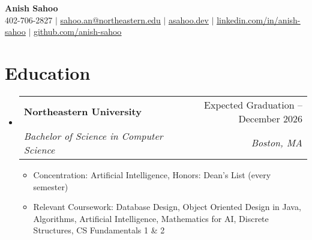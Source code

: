 \documentclass[letterpaper,11pt]{article}
\makeatletter
\newcommand{\resumeItem}[1]{
  \item\small{
    {#1 \vspace{-2pt}}
  }
}
\newcommand{\resumeSubheading}[4]{
  \vspace{-2pt}\item
    \begin{tabular*}{0.97\textwidth}[t]{l@{\extracolsep{\fill}}r}
      \textbf{#1} & #2 \\
      \textit{\small#3} & \textit{\small #4} \\
    \end{tabular*}\vspace{-7pt}
}
\newcommand{\resumeSubHeadingListStart}{\begin{itemize}[leftmargin=0.15in, label={}]}
\newcommand{\resumeSubHeadingListEnd}{\end{itemize}}
\newcommand{\resumeItemListStart}{\begin{itemize}}
\newcommand{\resumeItemListEnd}{\end{itemize}\vspace{-5pt}}
\makeatother
\begin{document}

\begin{center}
    \textbf{\Huge Anish Sahoo} \\ \vspace{1pt}
    \small 402-706-2827 
    $|$ 
    \href{mailto:sahoo.an@northeastern.edu}{\underline{sahoo.an@northeastern.edu}} $|$ 
    \href{https://asahoo.dev}{\underline{asahoo.dev}}
    $|$
    \href{https://linkedin.com/in/anish-sahoo}{\underline{linkedin.com/in/anish-sahoo}} $|$
    \href{https://github.com/anish-sahoo}{\underline{github.com/anish-sahoo}}
\end{center}


\section{Education}
  \resumeSubHeadingListStart
    \resumeSubheading
      {Northeastern University}{Expected Graduation -- December 2026}
      {Bachelor of Science in Computer Science}{Boston, MA}
    \resumeItemListStart
        \resumeItem{Concentration: Artificial Intelligence, Honors: Dean's List (every semester)}
        \resumeItem{Relevant Coursework: Database Design, Object Oriented Design in Java, Algorithms, Artificial Intelligence, Mathematics for AI, Discrete Structures, CS Fundamentals 1 \& 2}
    \resumeItemListEnd
  \resumeSubHeadingListEnd
\end{document}
